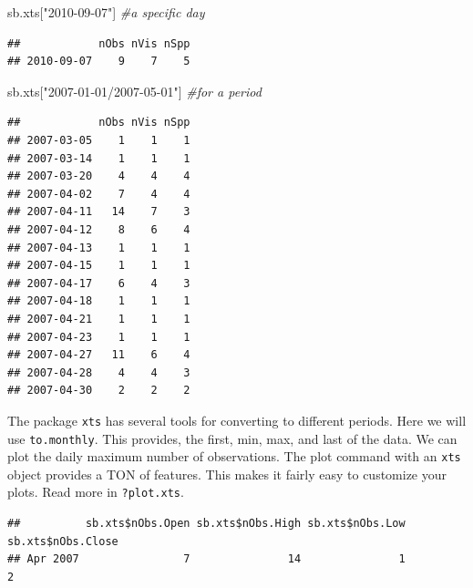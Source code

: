 \documentclass[
  10pt,
]{article}
\newenvironment{Shaded}{\begin{snugshade}}{\end{snugshade}}
\newcommand{\CommentTok}[1]{\textcolor[rgb]{0.56,0.35,0.01}{\textit{#1}}}
\newcommand{\FunctionTok}[1]{\textcolor[rgb]{0.00,0.00,0.00}{#1}}
\newcommand{\NormalTok}[1]{#1}
\newcommand{\OtherTok}[1]{\textcolor[rgb]{0.56,0.35,0.01}{#1}}
\newcommand{\SpecialCharTok}[1]{\textcolor[rgb]{0.00,0.00,0.00}{#1}}
\newcommand{\StringTok}[1]{\textcolor[rgb]{0.31,0.60,0.02}{#1}}
\begin{document}
\begin{Shaded}
\begin{Highlighting}[]
\NormalTok{sb.xts[}\StringTok{"2010{-}09{-}07"}\NormalTok{] }\CommentTok{\#a specific day}
\end{Highlighting}
\end{Shaded}

\begin{verbatim}
##            nObs nVis nSpp
## 2010-09-07    9    7    5
\end{verbatim}

\begin{Shaded}
\begin{Highlighting}[]
\NormalTok{sb.xts[}\StringTok{"2007{-}01{-}01/2007{-}05{-}01"}\NormalTok{] }\CommentTok{\#for a period}
\end{Highlighting}
\end{Shaded}

\begin{verbatim}
##            nObs nVis nSpp
## 2007-03-05    1    1    1
## 2007-03-14    1    1    1
## 2007-03-20    4    4    4
## 2007-04-02    7    4    4
## 2007-04-11   14    7    3
## 2007-04-12    8    6    4
## 2007-04-13    1    1    1
## 2007-04-15    1    1    1
## 2007-04-17    6    4    3
## 2007-04-18    1    1    1
## 2007-04-21    1    1    1
## 2007-04-23    1    1    1
## 2007-04-27   11    6    4
## 2007-04-28    4    4    3
## 2007-04-30    2    2    2
\end{verbatim}

The package \texttt{xts} has several tools for converting to different periods. Here we will use \texttt{to.monthly}. This provides, the first, min, max, and last of the data. We can plot the daily maximum number of observations. The plot command with an \texttt{xts} object provides a TON of features. This makes it fairly easy to customize your plots. Read more in \texttt{?plot.xts}.

\begin{Shaded}
\end{Shaded}

\begin{verbatim}
##          sb.xts$nObs.Open sb.xts$nObs.High sb.xts$nObs.Low sb.xts$nObs.Close
## Apr 2007                7               14               1                 2
\end{verbatim}
\end{document}
